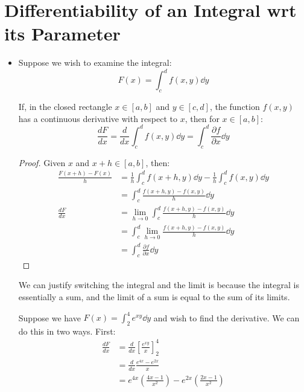 \section{Differentiability of an Integral wrt its Parameter}
\begin{itemize}
    \item Suppose we wish to examine the integral:
    \begin{equation}
        F(x) = \int_c^d f(x,y) \dd{y}
    \end{equation}
    \begin{theorem}
        If, in the closed rectangle $x\in [a,b]$ and $y\in [c,d]$, the function $f(x,y)$ has a continuous derivative with respect to $x$, then for $x\in[a,b]$:
        \begin{equation}
            \frac{dF}{dx} = \frac{d}{dx} \int_c^d f(x,y) \dd{y} = \int_c^d \frac{\partial f}{\partial x}\dd{y}
        \end{equation}
    \end{theorem}
    \begin{proof}
        Given $x$ and $x+h \in [a,b]$, then:
        \begin{align}
            \frac{F(x+h)-F(x)}{h} &= \frac{1}{h}\int_c^d f(x+h, y) \dd{y} - \frac{1}{h} \int_c^d f(x,y) \dd{y} \\ 
            &= \int_c^d \frac{f(x+h,y)-f(x,y)}{h}\dd{y} \\ 
            \frac{dF}{dx} &= \lim_{h\to 0}\int_c^d \frac{f(x+h,y)-f(x,y)}{h} \dd{y} \\ 
            &= \int_c^d \lim_{h\to 0} \frac{f(x+h,y)-f(x,y)}{h} \dd{y} \\ 
            &= \int_c^d \frac{\partial f}{\partial x}\dd{y}
        \end{align}
    \end{proof}
    We can justify switching the integral and the limit is because the integral is essentially a sum, and the limit of a sum is equal to the sum of its limits.
    \begin{example}
        Suppose we have $F(x) = \int_2^4 e^{xy} \dd{y}$ and wish to find the derivative. We can do this in two ways. First:
        \begin{align}
            \frac{dF}{dx} &= \frac{d}{dx} \left[\frac{e^{xy}}{x}\right]^4_2 \\ 
            &= \frac{d}{dx} \frac{e^{4x}-e^{2x}}{x} \\ 
            &= e^{4x} \left(\frac{4x-1}{x^2}\right)-e^{2x} \left(\frac{2x-1}{x^2}\right)
        \end{align}

\end{example}
\end{itemize}
